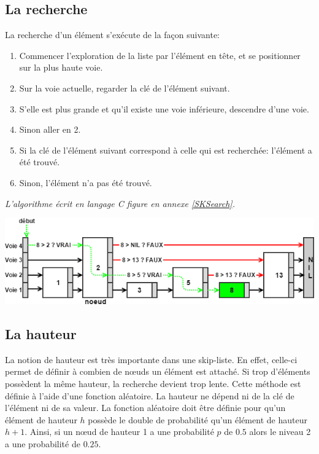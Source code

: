 \documentclass[hidelinks,a4paper, 12pt]{article}
\begin{document}
	\subsection{La recherche}
	La recherche d'un élément s'exécute de la façon suivante:
	\begin{enumerate}
		\item Commencer l'exploration de la liste par l'élément en tête, et se positionner sur la plus haute voie.
		\item Sur la voie actuelle, regarder la clé de l'élément suivant.
		\item S'elle est plus grande et qu'il existe une voie inférieure, descendre d'une voie.
		\item Sinon aller en 2.
		\item Si la clé de l'élément suivant correspond à celle qui est recherchée: l'élément a été trouvé.
		\item Sinon, l'élément n'a pas été trouvé.
	\end{enumerate}
	\emph{L'algorithme écrit en langage C figure en annexe \ref{SKSearch}.}
	\begin{center}
		\includegraphics[width=\textwidth]{img/search}
	\end{center}
	
	\subsection{La hauteur}
	La notion de hauteur est très importante dans une skip-liste. En effet, celle-ci permet de définir à combien de nœuds un élément est attaché. Si trop d'éléments possèdent la même hauteur, la recherche devient trop lente.	Cette méthode est définie à l'aide d'une fonction aléatoire. La hauteur ne dépend ni de la clé de l'élément ni de sa valeur. La fonction aléatoire doit être définie pour qu'un élément de hauteur $h$ possède le double de probabilité qu'un élément de hauteur $h+1$. Ainsi, si un nœud de hauteur 1 a une probabilité $p$ de $0.5$ alors le niveau 2 a une probabilité de $0.25$.
	
\end{document}
